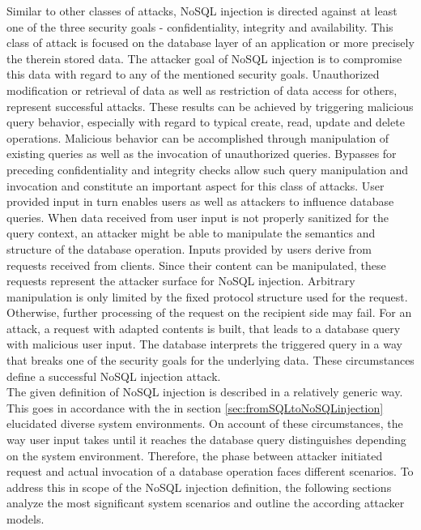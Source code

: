 Similar to other classes of attacks, NoSQL injection is directed against at least one of the three security goals - confidentiality, integrity and availability. This class of attack is focused on the database layer of an application or more precisely the therein stored data. The attacker goal of NoSQL injection is to compromise this data with regard to any of the mentioned security goals. Unauthorized modification or retrieval of data as well as restriction of data access for others, represent successful attacks. These results can be achieved by triggering malicious query behavior, especially with regard to typical create, read, update and delete operations. Malicious behavior can be accomplished through manipulation of existing queries as well as the invocation of unauthorized queries. Bypasses for preceding confidentiality and integrity checks allow such query manipulation and invocation and constitute an important aspect for this class of attacks. User provided input in turn enables users as well as attackers to influence database queries. When data received from user input is not properly sanitized for the query context, an attacker might be able to manipulate the semantics and structure of the database operation. Inputs provided by users derive from requests received from clients. Since their content can be manipulated, these requests represent the attacker surface for NoSQL injection. Arbitrary manipulation is only limited by the fixed protocol structure used for the request. Otherwise, further processing of the request on the recipient side may fail. For an attack, a request with adapted contents is built, that leads to a database query with malicious user input. The database interprets the triggered query in a way that breaks one of the security goals for the underlying data. These circumstances define a successful NoSQL injection attack.\\

The given definition of NoSQL injection is described in a relatively generic way. This goes in accordance with the in section \ref{sec:fromSQLtoNoSQLinjection} elucidated diverse system environments. On account of these circumstances, the way user input takes until it reaches the database query distinguishes depending on the system environment. Therefore, the phase between attacker initiated request and actual invocation of a database operation faces different scenarios. To address this in scope of the NoSQL injection definition, the following sections analyze the most significant system scenarios and outline the according attacker models.

